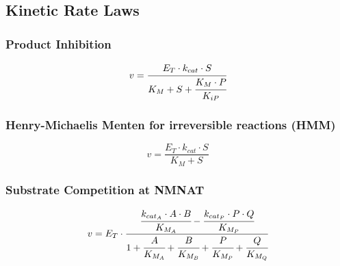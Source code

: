 \documentclass[a4paper,10pt]{article} \usepackage[utf8x]{inputenc}
\begin{document}
\subsection*{Kinetic Rate Laws}


\subsubsection*{Product Inhibition}
\begin{equation}
v=\cfrac{E_T\cdot k_{cat}\cdot S}{K_M + S + \cfrac{K_M\cdot P}{K_{iP}} }
\end{equation}


\subsubsection*{Henry-Michaelis Menten for irreversible reactions (HMM)}
\begin{equation}
v=\frac{E_T\cdot k_{cat}\cdot S}{K_M + S}
\end{equation}


\subsubsection*{Substrate Competition at NMNAT}
\begin{equation}
v=E_T \cdot \cfrac{\cfrac{k_{{cat}_{A}}\cdot A \cdot
B}{K_{{M}_A}}-\cfrac{k_{{cat}_{P}}\cdot P \cdot
Q}{K_{{M}_P}}}{1+\cfrac{A}{K_{{M}_A}}+\cfrac{B}{K_{{M}_B}}+\cfrac{P}{K_{{M}_P}}+\cfrac{Q}{K_{{M}_Q}}}
\end{equation}





\end{document}
